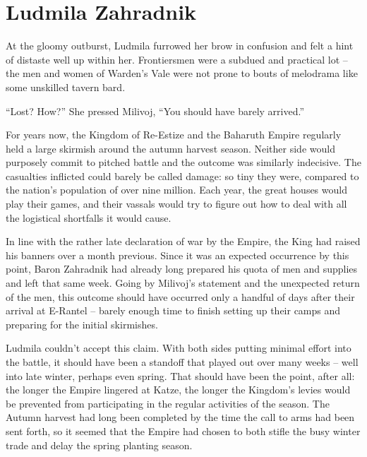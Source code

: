 \chapter{Ludmila Zahradnik}

At the gloomy outburst, Ludmila furrowed her brow in confusion and felt a hint of distaste well up within her. Frontiersmen were a subdued and practical lot – the men and women of Warden’s Vale were not prone to bouts of melodrama like some unskilled tavern bard.

 

“Lost? How?” She pressed Milivoj, “You should have barely arrived.”

 

For years now, the Kingdom of Re-Estize and the Baharuth Empire regularly held a large skirmish around the autumn harvest season. Neither side would purposely commit to pitched battle and the outcome was similarly indecisive. The casualties inflicted could barely be called damage: so tiny they were, compared to the nation’s population of over nine million. Each year, the great houses would play their games, and their vassals would try to figure out how to deal with all the logistical shortfalls it would cause.

 

In line with the rather late declaration of war by the Empire, the King had raised his banners over a month previous. Since it was an expected occurrence by this point, Baron Zahradnik had already long prepared his quota of men and supplies and left that same week. Going by Milivoj's statement and the unexpected return of the men, this outcome should have occurred only a handful of days after their arrival at E-Rantel – barely enough time to finish setting up their camps and preparing for the initial skirmishes.

 

Ludmila couldn't accept this claim. With both sides putting minimal effort into the battle, it should have been a standoff that played out over many weeks – well into late winter, perhaps even spring. That should have been the point, after all: the longer the Empire lingered at Katze, the longer the Kingdom’s levies would be prevented from participating in the regular activities of the season. The Autumn harvest had long been completed by the time the call to arms had been sent forth, so it seemed that the Empire had chosen to both stifle the busy winter trade and delay the spring planting season.

 


